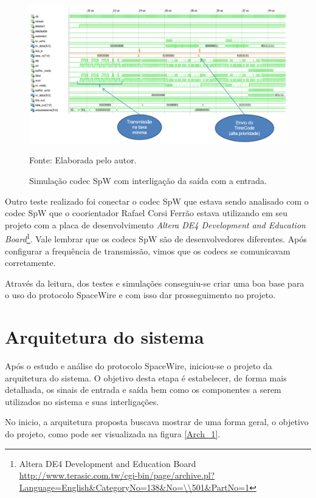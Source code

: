 \begin{figure}[!htb]
	\centering
	\caption{Simulação codec SpW com interligação da saída com a entrada.}
	\includegraphics[scale = 0.7, angle = 90]{Imagens/SimulSpW_1}
	
	Fonte: Elaborada pelo autor.
	
	\label{SimulSpW_1}
\end{figure}

Outro teste realizado foi conectar o codec SpW que estava sendo analisado com o codec SpW que o coorientador Rafael Corsi Ferrão estava utilizando em seu projeto com a placa de desenvolvimento \textit{Altera DE4 Development and Education Board}\footnote{Altera DE4 Development and Education Board \url{http://www.terasic.com.tw/cgi-bin/page/archive.pl?Language=English\&CategoryNo=138\&No=\\501\&PartNo=1}}. Vale lembrar que os codecs SpW são de desenvolvedores diferentes. Após configurar a frequência de transmissão, vimos que os codecs se comunicavam corretamente.

Através da leitura, dos testes e simulações conseguiu-se criar uma boa base para o uso do protocolo SpaceWire e com isso dar prosseguimento no projeto.

\section{Arquitetura do sistema}

Após o estudo e análise do protocolo SpaceWire, iniciou-se o projeto da arquitetura do sistema. O objetivo desta etapa é estabelecer, de forma mais detalhada, os sinais de entrada e saída bem como os componentes a serem utilizados no sistema e suas interligações.

No inicio, a arquitetura proposta buscava mostrar de uma forma geral, o objetivo do projeto, como pode ser visualizada na figura \ref{Arch_1}.

